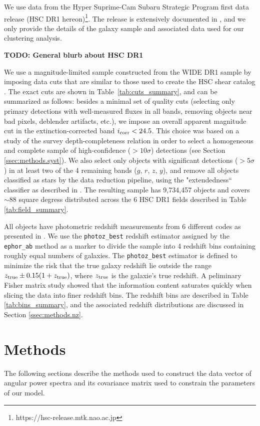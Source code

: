 \documentclass[a4paper,11pt]{article}
\newcommand{\todo}[1]{{\bf TODO: #1}}
\begin{document}
  We use data from the Hyper Suprime-Cam Subaru Strategic Program first data release (HSC DR1 hereon)\footnote{https://hsc-release.mtk.nao.ac.jp}. The release is extensively documented in \cite{2018PASJ...70S...8A}, and we only provide the details of the galaxy sample and associated data used for our clustering analysis.
  
  \todo{General blurb about HSC DR1}
  
  We use a magnitude-limited sample constructed from the WIDE DR1 sample by imposing data cuts that are similar to those used to create the HSC shear catalog \cite{2018PASJ...70S..25M}. The exact cuts are shown in Table~\ref{tab:cuts_summary}, and can be summarized as follows: besides a minimal set of quality cuts (selecting only primary detections with well-measured fluxes in all bands, removing objects near bad pixels, deblender artifacts, etc.), we impose an overall apparent magnitude cut in the extinction-corrected band $i_{\rm corr}<24.5$. This choice was based on a study of the survey depth-completeness relation in order to select a homogeneous and complete sample of high-confidence ($>10\sigma$) detections (see Section \ref{ssec:methods.syst}). We also select only objects with significant detections ($>5\sigma$) in at least two of the 4 remaining bands ($g,\,r,\,z,\,y$), and remove all objects classified as stars by the data reduction pipeline, using the "extendedness`` classifier as described in \cite{2018PASJ...70S..25M,2018PASJ...70S...5B}. The resulting sample has 9,734,457 objects and covers $\sim88$ square degress distributed across the 6 HSC DR1 fields described in Table \ref{tab:field_summary}.

  All objects have photometric redshift measurements from 6 different codes as presented in \cite{2018PASJ...70S...9T}. We use the {\tt photoz\_best} redshift estimator assigned by the {\tt ephor\_ab} method as a marker to divide the sample into 4 redshift bins containing roughly equal numbers of galaxies. The {\tt photoz\_best} estimator is defined to minimize the risk that the true galaxy redshift lie outside the range $z_{\rm true}\pm 0.15(1+z_{\rm true})$, where $z_{\rm true}$ is the galaxie's true redshift. A peliminary Fisher matrix study showed that the information content saturates quickly when slicing the data into finer redshift bins. The redshift bins are described in Table \ref{tab:bins_summary}, and the associated redshift distributions are discussed in Section \ref{ssec:methods.nz}.

\section{Methods}\label{sec:methods}
  The following sections describe the methods used to construct the data vector of angular power spectra and its covariance matrix used to constrain the parameters of our model.
  
\end{document}
